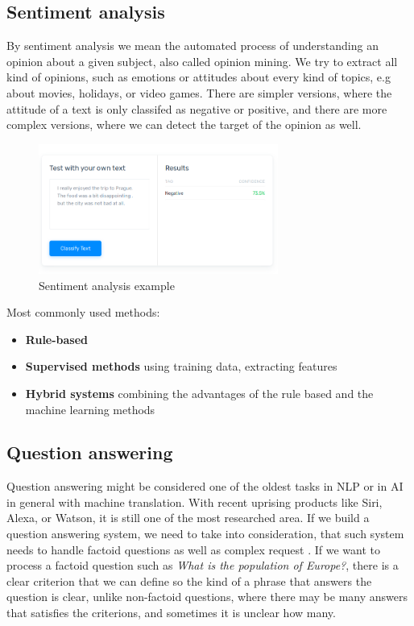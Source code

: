 \subsection{Sentiment analysis}

By sentiment analysis we mean the automated process of understanding an opinion about a given subject, also called opinion mining. We try to extract all kind of opinions, such as emotions or attitudes about every kind of topics, e.g about movies, holidays, or video games. There are simpler versions, where the attitude of a text is only classifed as negative or positive, and there are more complex versions, where we can detect the target of the opinion as well.

\begin{figure}[h!]
	\centering
	\includegraphics[width=0.7\textwidth]{figures/sentiment}
	\caption{Sentiment analysis example}
	\label{fig:sen}
\end{figure}

Most commonly used methods:
\begin{itemize}
	\item \textbf{Rule-based}
	\item \textbf{Supervised methods} using training data, extracting features
	\item \textbf{Hybrid systems} combining the advantages of the rule based and the machine learning methods
\end{itemize}

\subsection{Question answering}
Question answering might be considered one of the oldest tasks in NLP or in AI in general with machine translation. With recent uprising products like Siri, Alexa, or Watson, it is still one of the most researched area.
If we build a question answering system, we need to take into consideration, that such system needs to handle factoid questions as well as complex request \cite{Ralph:2017}. If we want to process a factoid question such as \textit{What is the population of Europe?}, there is a clear criterion that we can define so the kind of a phrase that answers the question is clear, unlike non-factoid questions, where there may be many answers that satisfies the criterions, and sometimes it is unclear how many.

